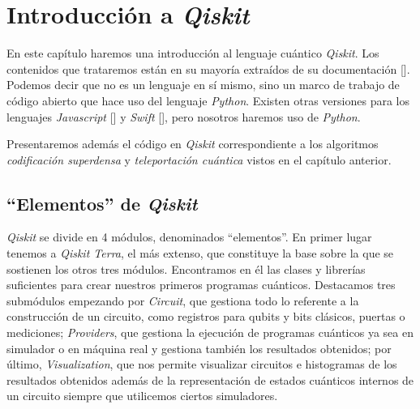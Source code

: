 \chapter{Introducción a \textit{Qiskit}}

En este capítulo haremos una introducción al lenguaje cuántico \textit{Qiskit}. Los contenidos que trataremos están en su mayoría extraídos de su documentación [\cite{qiskit2020doc}]. Podemos decir que no es un lenguaje en sí mismo, sino un marco de trabajo de código abierto que hace uso del lenguaje \textit{Python}. Existen otras versiones para los lenguajes \textit{Javascript} [\cite{qiskit2017javscript}] y \textit{Swift} [\cite{qiskit2017swift}], pero nosotros haremos uso de \textit{Python}.

Presentaremos además el código en \textit{Qiskit} correspondiente a los algoritmos \textit{codificación superdensa} y \textit{teleportación cuántica} vistos en el capítulo anterior.

\section{``Elementos'' de \textit{Qiskit}}
\label{sec:sec51}

\textit{Qiskit} se divide en 4 módulos, denominados ``elementos''. En primer lugar tenemos a \textit{Qiskit Terra}, el más extenso, que constituye la base sobre la que se sostienen los otros tres módulos. Encontramos en él las clases y librerías  suficientes para crear nuestros primeros programas cuánticos. Destacamos tres submódulos empezando por \textit{Circuit}, que gestiona todo lo referente a la construcción de un circuito, como registros para qubits y bits clásicos, puertas o mediciones; \textit{Providers}, que gestiona la ejecución de programas cuánticos ya sea en simulador o en máquina real y gestiona también los resultados obtenidos; por último, \textit{Visualization}, que nos permite visualizar circuitos e histogramas de los resultados obtenidos además de la representación de estados cuánticos internos de un circuito siempre que utilicemos ciertos simuladores.


